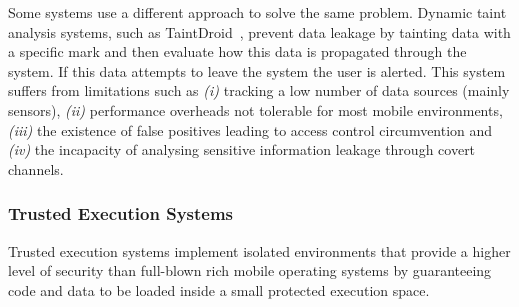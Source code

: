 Some systems use a different approach to solve the same problem. Dynamic taint analysis systems, such as TaintDroid~\cite{enck2014taintdroid}, prevent data leakage by tainting data with a specific mark and then evaluate how this data is propagated through the system. If this data attempts to leave the system the user is alerted. This system suffers from limitations such as \emph{(i)} tracking a low number of data sources (mainly sensors), \emph{(ii)} performance overheads not tolerable for most mobile environments, \emph{(iii)} the existence of false positives leading to access control circumvention and \emph{(iv)} the incapacity of analysing sensitive information leakage through covert channels.


\subsubsection{Trusted Execution Systems}
\label{sec:tee}


Trusted execution systems implement isolated environments that provide a higher level of security than full-blown rich mobile operating systems by guaranteeing code and data to be loaded inside a small protected execution space.


